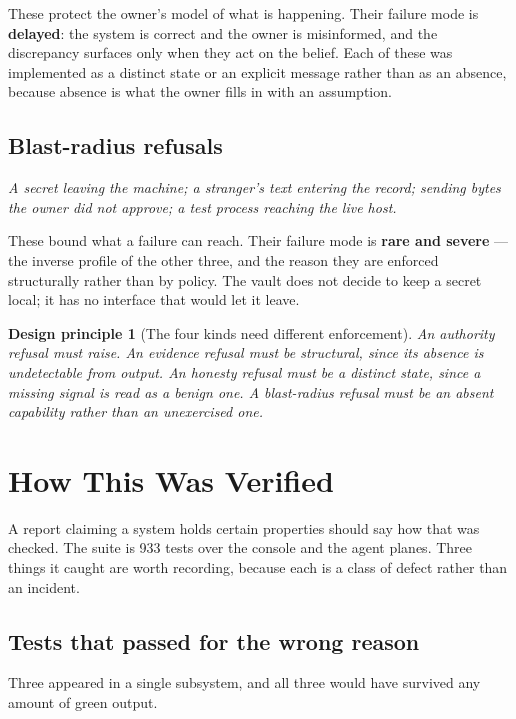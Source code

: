 \documentclass[11pt]{article}
\newtheorem{principle}{Design principle}
\begin{document}
These protect the owner's model of what is happening. Their failure mode is \textbf{delayed}: the system is correct and the owner is misinformed, and the discrepancy surfaces only when they act on the belief. Each of these was implemented as a distinct state or an explicit message rather than as an absence, because absence is what the owner fills in with an assumption.

\subsection{Blast-radius refusals}

\emph{A secret leaving the machine; a stranger's text entering the record; sending bytes the owner did not approve; a test process reaching the live host.}

These bound what a failure can reach. Their failure mode is \textbf{rare and severe} --- the inverse profile of the other three, and the reason they are enforced structurally rather than by policy. The vault does not decide to keep a secret local; it has no interface that would let it leave.

\begin{principle}[The four kinds need different enforcement]
\label{prin:kinds}
An authority refusal must raise. An evidence refusal must be structural, since its absence is undetectable from output. An honesty refusal must be a distinct state, since a missing signal is read as a benign one. A blast-radius refusal must be an absent capability rather than an unexercised one.
\end{principle}

\section{How This Was Verified}
\label{sec:verified}

A report claiming a system holds certain properties should say how that was checked. The suite is 933 tests over the console and the agent planes. Three things it caught are worth recording, because each is a class of defect rather than an incident.

\subsection{Tests that passed for the wrong reason}

Three appeared in a single subsystem, and all three would have survived any amount of green output.
\end{document}
